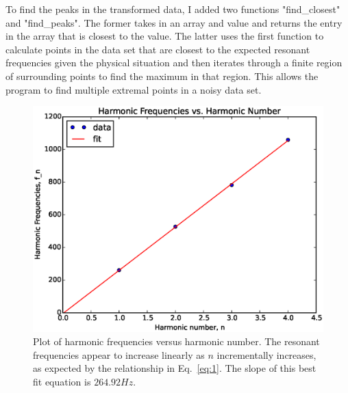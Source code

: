 \documentclass[12pt]{article}
\begin{document}
To find the peaks in the transformed data, I added two functions "find\_closest"
and "find\_peaks". The former takes in an array and value and returns the entry
in the array that is closest to the value. The latter uses the first function
to calculate points in the data set that are closest to the expected resonant
frequencies given the physical situation and then iterates through a finite
region of surrounding points to find the maximum in that region. This allows
the program to find multiple extremal points in a noisy data set.

\begin{figure}[h]
\begin{center}
\includegraphics[width=300bp]{noise2_fvn.eps}
\vspace{-18bp}
\end{center}
\caption[]{\label{fig:fvn}\small
Plot of harmonic frequencies versus harmonic number. The resonant frequencies
appear to increase linearly as $n$ incrementally increases, as expected by
the relationship in Eq.~\ref{eq:1}. The slope of this best fit equation is
$264.92 Hz$.
}
\end{figure}
\end{document}
